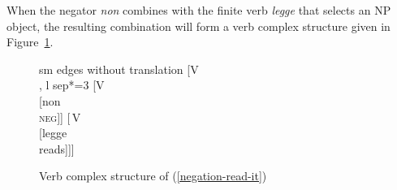 \documentclass[output=paper
                ,modfonts
                ,nonflat
	        ,collection
	        ,collectionchapter
	        ,collectiontoclongg
 	        ,biblatex
                ,babelshorthands
                ,newtxmath
                ,draftmode
                ,colorlinks, citecolor=brown
]{./langsci/langscibook}
\begin{document}
{\begin{exe}
\begin{xlist}
\noindent
When the negator \textit{non} combines with the finite verb \textit{legge} that
selects an NP object, the resulting combination will form
a verb complex structure given in Figure~\ref{negation-read-it-st}.



\begin{figure}
	\begin{forest}
sm edges without translation
		[V\\
		, l sep*=3
			[V\\
				[non\\ \textsc{\sc neg}]]
			[\,V\\
					[legge\\ reads]]]
	\end{forest}
\caption{Verb complex structure of (\ref{negation-read-it})}\label{negation-read-it-st}
\end{figure}



\end{xlist}
\end{exe}}
\end{document}
